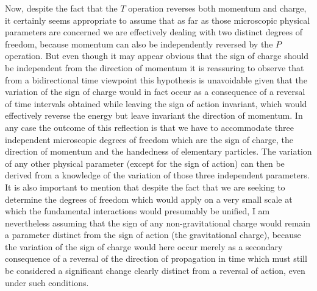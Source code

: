 \documentclass[notitlepage,12pt]{report}
\begin{document}
Now, despite the fact that the $T$ operation reverses both momentum and charge, it certainly seems appropriate to assume that as far as those microscopic physical parameters are concerned we are effectively dealing with two distinct degrees of freedom, because momentum can also be independently reversed by the $P$ operation. But even though it may appear obvious that the sign of charge should be independent from the direction of momentum it is reassuring to observe that from a bidirectional time viewpoint this hypothesis is unavoidable given that the variation of the sign of charge would in fact occur as a consequence of a reversal of time intervals obtained while leaving the sign of action invariant, which would effectively reverse the energy but leave invariant the direction of momentum. In any case the outcome of this reflection is that we have to accommodate three independent microscopic degrees of freedom which are the sign of charge, the direction of momentum and the handedness of elementary particles. The variation of any other physical parameter (except for the sign of action) can then be derived from a knowledge of the variation of those three independent parameters. It is also important to mention that despite the fact that we are seeking to determine the degrees of freedom which would apply on a very small scale at which the fundamental interactions would presumably be unified, I am nevertheless assuming that the sign of any non-gravitational charge would remain a parameter distinct from the sign of action (the gravitational charge), because the variation of the sign of charge would here occur merely as a secondary consequence of a reversal of the direction of propagation in time which must still be considered a significant change clearly distinct from a reversal of action, even under such conditions.
\end{document}
